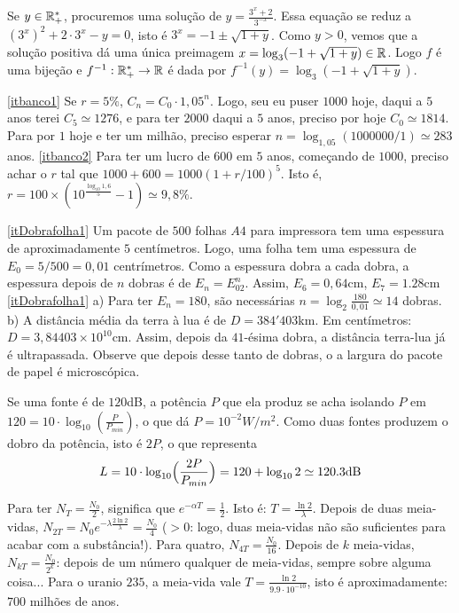 \begin{Solution}{3.9}
Se $y\in \mathbb{R}_+^*$, procuremos uma solução de
$y=\frac{3^x+2}{3^{-x}}$. Essa equação se reduz a $(3^x)^2+2\cdot 3^x-y=0$, isto
é $3^x=-1\pm \sqrt{1+y}$. Como $y>0$, vemos que a solução positiva dá uma única
preimagem $x=\log_3(-1+\sqrt{1+y})\in \mathbb{R}$. Logo $f$ é uma bijeção e
$f^{-1}:\mathbb{R}_+^*\to \mathbb{R}$ é dada por $f^{-1}(y)=\log_3(-1+\sqrt{1+y})$.
\end{Solution}
\begin{Solution}{3.10}
\eqref{itbanco1} Se $r=5\%$, $C_n=C_0\cdot 1,05^n$.
Logo, seu eu puser $1000$ hoje, daqui a $5$ anos terei
$C_5\simeq 1276$, e
para ter $2000$ daqui a $5$ anos, preciso por hoje $C_0\simeq 1814$.
Para por $1$ hoje e ter um milhão, preciso esperar
$n=\log_{1,05}(1000000/1)\simeq 283$ anos.
\eqref{itbanco2} Para ter um lucro de $600$ em $5$ anos, começando de $1000$,
preciso achar o $r$ tal que
$1000+600=1000(1+r/100)^5$. Isto é, $r=100\times
(10^{\frac{\log_{10}1,6}{5}}-1)\simeq 9,8\%$.
\end{Solution}
\begin{Solution}{3.11}
\eqref{itDobrafolha1}
Um pacote de $500$ folhas $A4$ para impressora tem uma espessura de
aproximadamente $5$ centímetros. Logo, uma folha tem uma espessura de
$E_0=5/500=0,01$ centrímetros. Como a espessura dobra a cada dobra, a espessura
depois de $n$ dobras é de $E_n=E_02^n$. Assim, $E_6=0,64$cm, $E_7=1.28$cm
\eqref{itDobrafolha1} a) Para ter $E_n=180$, são necessárias
$n=\log_{2}\frac{180}{0,01}\simeq 14$ dobras.
b) A distância média da terra à lua é de $D=384'403$km. Em centímetros:
$D=3,84403\times 10^{10}$cm. Assim, depois da $41$-ésima dobra, a distância
terra-lua já é ultrapassada.
Observe que depois desse tanto de dobras, o a largura do pacote de papel é
microscópica.
\end{Solution}
\begin{Solution}{3.12}
Se uma fonte é de $120$dB, a potência $P$ que ela produz se acha
isolando $P$ em $120=10\cdot \log_{10}(\tfrac{P}{P_{min}})$, o que dá
$P=10^{-2}W/m^2$.
Como duas fontes produzem o dobro da potência, isto é $2P$, o que representa
\[L=10\cdot
\log_{10}\Bigl(\frac{2P}{P_{min}}\Bigr)=120+\log_{10}2\simeq 120.3\text{dB}\]
\end{Solution}
\begin{Solution}{3.13}
Para ter $N_T=\tfrac{N_0}{2}$, significa que $e^{-\alpha T}=\tfrac12$. Isto é:
$T=\tfrac{\ln 2}{\lambda}$.
Depois de duas meia-vidas, $N_{2T}=N_0e^{-\lambda\tfrac{2 \ln
2}{\lambda}}=\frac{N_0}{4}$ ($>0$: logo, duas meia-vidas não são suficientes
para acabar com a substância!).
Para quatro, $N_{4T}=\frac{N_0}{16}$. Depois de $k$ meia-vidas,
$N_{kT}=\frac{N_0}{2^k}$:
depois de um número qualquer de meia-vidas, sempre sobre alguma coisa...
Para o uranio $235$, a meia-vida vale $T=\frac{\ln 2}{9.9\cdot 10^{-10}}$, isto
é aproximadamente: $700$ milhões de anos.
\end{Solution}
